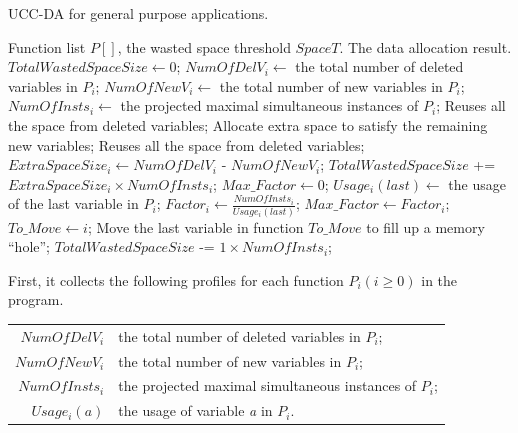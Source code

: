 \begin{algorithm}
\singlespace
\caption{UCC-DA for general purpose applications.}
\label{alg-data}
\begin{algorithmic}[1]
\singlespace
\REQUIRE Function list $P[]$, the wasted space threshold $SpaceT$.
\ENSURE The data allocation result.
\STATE $TotalWastedSpaceSize \leftarrow 0$;
\STATE $NumOfDelV_i \leftarrow $ the total number of deleted variables in $P_i$;
\STATE $NumOfNewV_i \leftarrow $ the total number of new variables in $P_i$; 
\STATE $NumOfInsts_i \leftarrow $ the projected maximal simultaneous instances of $P_i$;
\STATE Reuses all the space from deleted variables;
\STATE Allocate extra space to satisfy the remaining new variables;
\ELSE
\STATE Reuses all the space from deleted variables;
\STATE $ExtraSpaceSize_i \leftarrow NumOfDelV_i$ - $NumOfNewV_i$;
\STATE $TotalWastedSpaceSize$ += $ExtraSpaceSize_i \times NumOfInsts_i$;
\ENDIF
\ENDFOR
{}
\STATE $Max\_Factor \leftarrow 0$;
\STATE $Usage_i(last) \leftarrow$  the usage of the last variable in $P_i$;
\STATE $Factor_i \leftarrow \frac{NumOfInsts_i}{Usage_i(last)}$;
\STATE $Max\_Factor \leftarrow Factor_i$;
\STATE $To\_Move \leftarrow i$;
\ENDIF
\ENDFOR
\STATE Move the last variable in function $To\_Move$ to fill up a memory ``hole'';
\STATE $TotalWastedSpaceSize$ -= $1\times NumOfInsts_i$;
\ENDWHILE
\end{algorithmic}
\end{algorithm}
\vspace{0.2in}
First, it collects the following profiles for each function $P_i(i\geq
0)$ in the program. 
\vspace{+0.1in}
\begin{small}
\begin{center}
\begin{tabular}{r|l}
$NumOfDelV_i$ & the total number of deleted variables in $P_i$; \\
$NumOfNewV_i$ & the total number of new variables in $P_i$; \\
$NumOfInsts_i$ & the projected maximal simultaneous instances of $P_i$; \\
$Usage_i(a)$ & the usage of variable {\it a} in $P_i$. 
\end{tabular}
\end{center}
\end{small}

